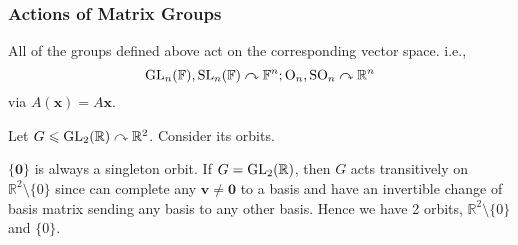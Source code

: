 \documentclass[a4paper]{article}
\begin{document}
    \subsubsection{Actions of Matrix Groups}
    All of the groups defined above act on the corresponding vector space. i.e., 
    \[
        \mathrm{GL}_n(\mathbb{F}),\mathrm{SL}_n(\mathbb{F}) \curvearrowright \mathbb{F}^n; \mathrm{O}_n,\mathrm{SO}_n \curvearrowright \mathbb{R}^n
    \]
    via $ A(\mathbf{x})=A\mathbf{x} $.

    \begin{example}
        Let $ G\leqslant \mathrm{GL}_2(\mathbb{R})\curvearrowright \mathbb{R}^2 $. Consider its orbits.

        $ \{\mathbf{0}\} $ is always a singleton orbit. If $ G=\mathrm{GL}_2(\mathbb{R}) $, then $G$ acts transitively on $ \mathbb{R}^{2}\setminus\{0\} $ since can complete any $ \mathbf{v}\neq \mathbf{0} $ to a basis and have an invertible change of basis matrix sending any basis to any other basis. Hence we have 2 orbits, $ \mathbb{R}^{2}\setminus\{0\} $ and $ \{0\} $.
    \end{example}
\end{document}
